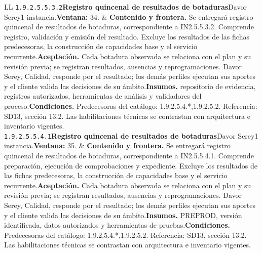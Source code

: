 \begin{longtable}{L{\tabcolsep\relax}L{\tabcolsep\relax}}
\texttt{1.\allowbreak{}9.\allowbreak{}2.\allowbreak{}5.\allowbreak{}5.\allowbreak{}3.\allowbreak{}2}\newline{}\textbf{Registro quincenal de resultados de botaduras}\newline{}Davor Serey\newline{}1 instancia.\newline{}\textbf{Ventana:} 34. & \textbf{Contenido y frontera.} Se entregará registro quincenal de resultados de botaduras, correspondiente a IN2.5.5.3.2. Comprende registro, validación y emisión del resultado. Excluye los resultados de las fichas predecesoras, la construcción de capacidades base y el servicio recurrente.\newline{}\textbf{Aceptación.} Cada botadura observada se relaciona con el plan y su revisión previa; se registran resultados, ausencias y reprogramaciones. Davor Serey, Calidad, responde por el resultado; los demás perfiles ejecutan sus aportes y el cliente valida las decisiones de su ámbito.\newline{}\textbf{Insumos.} repositorio de evidencia, registros autorizados, herramientas de análisis y validadores del proceso.\newline{}\textbf{Condiciones.} Predecesoras del catálogo: 1.9.2.5.4.*,1.9.2.5.2. Referencia: SD13, sección 13.2. Las habilitaciones técnicas se contrastan con arquitectura e inventario vigentes.\\\hline
\texttt{1.\allowbreak{}9.\allowbreak{}2.\allowbreak{}5.\allowbreak{}5.\allowbreak{}4.\allowbreak{}1}\newline{}\textbf{Registro quincenal de resultados de botaduras}\newline{}Davor Serey\newline{}1 instancia.\newline{}\textbf{Ventana:} 35. & \textbf{Contenido y frontera.} Se entregará registro quincenal de resultados de botaduras, correspondiente a IN2.5.5.4.1. Comprende preparación, ejecución de comprobaciones y expediente. Excluye los resultados de las fichas predecesoras, la construcción de capacidades base y el servicio recurrente.\newline{}\textbf{Aceptación.} Cada botadura observada se relaciona con el plan y su revisión previa; se registran resultados, ausencias y reprogramaciones. Davor Serey, Calidad, responde por el resultado; los demás perfiles ejecutan sus aportes y el cliente valida las decisiones de su ámbito.\newline{}\textbf{Insumos.} PREPROD, versión identificada, datos autorizados y herramientas de pruebas.\newline{}\textbf{Condiciones.} Predecesoras del catálogo: 1.9.2.5.4.*,1.9.2.5.2. Referencia: SD13, sección 13.2. Las habilitaciones técnicas se contrastan con arquitectura e inventario vigentes.\\\hline

\end{longtable}
